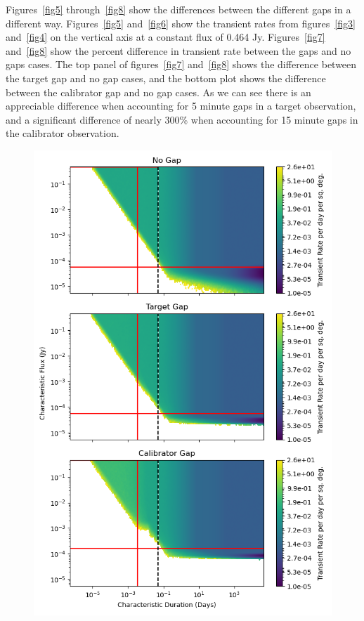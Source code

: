 \documentclass[12pt]{article}
\begin{document}
Figures~\ref{fig5} through~\ref{fig8} show the differences between the different gaps in a different way. Figures~\ref{fig5} and~\ref{fig6} show the transient rates from figures~\ref{fig3} and~\ref{fig4} on the vertical axis at a constant flux of 0.464 Jy. Figures~\ref{fig7} and~\ref{fig8} show the percent difference in transient rate between the gaps and no gaps cases. The top panel of figures~\ref{fig7} and~\ref{fig8} shows the difference between the target gap and no gap cases, and the bottom plot shows the difference between the calibrator gap and no gap cases. As we can see there is an appreciable difference when accounting for 5 minute gaps in a target observation, and a significant difference of nearly 300\% when accounting for 15 minute gaps in the calibrator observation.

\begin{figure}
\includegraphics[width=\columnwidth]{figure3.png}

\end{figure}
\end{document}
